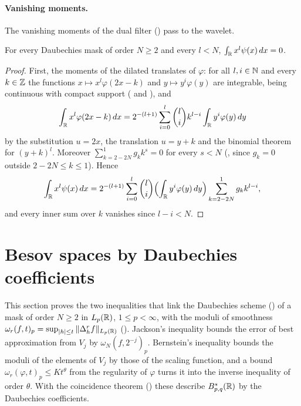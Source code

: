 \paragraph{Vanishing moments.}
The vanishing moments of the dual filter () pass to the wavelet.

\begin{theorem}
\label{thm:daub-vanishing-moments}
\leanok
{}
For every Daubechies mask of order $N \geq 2$ and every $l < N$,
$\int_{\mathbb{R}} x^l \psi(x) \, dx = 0$.
\end{theorem}

\begin{proof}
\leanok
{}
First, the moments of the dilated translates of $\varphi$: for all $l, i \in \mathbb{N}$ and every
$k \in \mathbb{Z}$ the functions $x \mapsto x^l \varphi(2x - k)$ and $y \mapsto y^i \varphi(y)$ are
integrable, being continuous with compact support
( and ), and
\[
  \int_{\mathbb{R}} x^l \varphi(2x - k) \, dx
  = 2^{-(l+1)} \sum_{i=0}^{l} \binom{l}{i} k^{l-i} \int_{\mathbb{R}} y^i \varphi(y) \, dy
\]
by the substitution $u = 2x$, the translation $u = y + k$ and the binomial theorem for
$(y + k)^l$. Moreover $\sum_{k = 2 - 2N}^{1} g_k k^s = 0$ for every $s < N$
(, since $g_k = 0$ outside $2 - 2N \leq k \leq 1$). Hence
\[
  \int_{\mathbb{R}} x^l \psi(x) \, dx = 2^{-(l+1)} \sum_{i=0}^{l} \binom{l}{i}
  \Bigl(\int_{\mathbb{R}} y^i \varphi(y) \, dy\Bigr) \sum_{k = 2 - 2N}^{1} g_k k^{l-i} ,
\]
and every inner sum over $k$ vanishes since $l - i < N$.
\end{proof}

\section{Besov spaces by Daubechies coefficients}
\label{sec:daubechies-besov-coefficients}

This section proves the two inequalities that link the Daubechies scheme
() of a mask of order $N \geq 2$ in $L_p(\mathbb{R})$, $1 \leq p < \infty$, with the
moduli of smoothness $\omega_r(f, t)_p = \sup_{|h| \leq t} \|\Delta_h^r f\|_{L_p(\mathbb{R})}$
(). Jackson's inequality bounds the error of best approximation from $V_j$
by $\omega_N(f, 2^{-j})_p$. Bernstein's inequality bounds the moduli of the elements of $V_j$ by
those of the scaling function, and a bound $\omega_r(\varphi, t)_p \leq K t^\theta$ from the
regularity of $\varphi$ turns it into the inverse inequality of order $\theta$. With the
coincidence theorem () these describe $B^{s}_{p,q}(\mathbb{R})$ by the
Daubechies coefficients.

